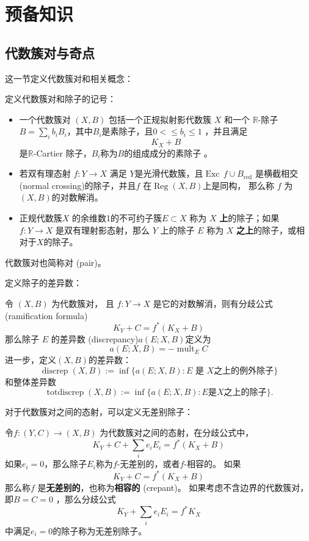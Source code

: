 \chapter{预备知识}
\section{代数簇对与奇点}
这一节定义代数簇对和相关概念：
\begin{definition}
  定义代数簇对和除子的记号：
  \begin{itemize}
    \item 一个代数簇对 $(X,B)$ 包括一个正规拟射影代数簇 $X$ 和一个 $\mathbb{R}$-除子 $B=\sum_{i}b_{i}B_{i}$，其中$B_{i}$是素除子，且$0<\leqslant b_{i} \leqslant 1$ ，并且满足
    \[ K_{X}+B \]
          是$\mathbb{R}$-Cartier 除子，$B_{i}$称为$B$的组成成分的素除子 。
    \item 若双有理态射 $f:Y\to X$ 满足 $Y$是光滑代数簇，且$\operatorname{Exc}\,f \cup B_{\text{red}} $ 是横截相交 (normal crossing)的除子，并且$f$ 在$\operatorname{Reg}(X,B)$上是同构， 那么称 $f$ 为 $(X,B)$的对数解消。  
    \item 正规代数簇$X$ 的余维数1的不可约子簇$ E \subset X $ 称为 $X$ \textbf{上}的除子；如果 $f: Y \to X$ 是双有理射影态射，那么 $Y$ 上的除子 $E$ 称为 $X$ \textbf{之上}的除子，或相对于$X$的除子。  
  \end{itemize}
  代数簇对也简称对 (pair)。
\end{definition}

定义除子的差异数：
\begin{definition}
  令 $(X, B)$ 为代数簇对， 且 $f: Y\to X$ 是它的对数解消，则有分歧公式 (ramification formula)
  \[ K_{Y}+C=f^*(K_{X}+B) \]
  那么除子 $E$ 的差异数 (discrepancy)$a(E;X,B) $定义为
  \[ a(E;X,B)=-\operatorname{mult}_{E}C \]
  进一步，定义$(X,B) $的差异数：
  \[ \operatorname{discrep}(X, B) := \inf\{a(E; X, B) : E \text{ 是 } X \text{之上的例外除子} \} \]
  和整体差异数
  \[ \operatorname{totdiscrep}(X, B) :=\inf \{a(E; X, B) : E \text{是} X \text{之上的除子}\}. \]
\end{definition}
对于代数簇对之间的态射，可以定义无差别除子：
\begin{definition}
 令$f:(Y,C)\to (X,B)$ 为代数簇对之间的态射，在分歧公式中，
 \[ K_{Y}+C + \sum_{i}e_{i}E_{i}=f^{*}(K_{X}+B) \]
 如果$e_{i}=0$，那么除子$E_{i}$称为$f$-无差别的，或者$f$-相容的。 如果
 \[ K_{Y}+C=f^{*}(K_{X}+B) \]
那么称$f$ 是\textbf{无差别的}，也称为\textbf{相容的}  (crepant)。
如果考虑不含边界的代数簇对，即$B=C=0$ ，那么分歧公式
 \[ K_{Y} + \sum_{i}e_{i}E_{i}=f^{*}K_{X} \]
 中满足$e_{i}=0$的除子称为无差别除子。
\end{definition}

